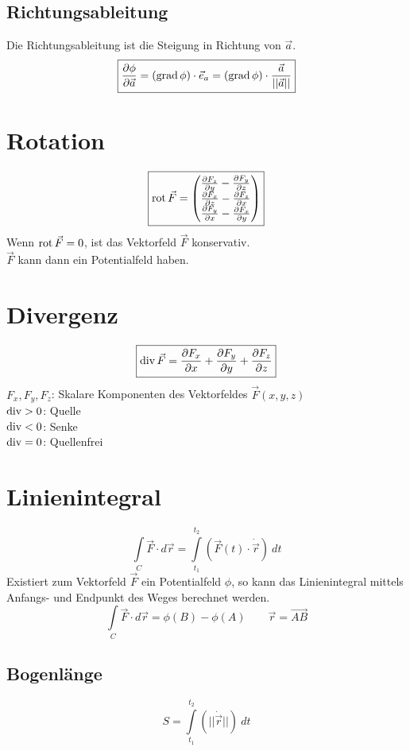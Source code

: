 \subsection{Richtungsableitung}
Die Richtungsableitung ist die Steigung in Richtung von $\vec{a}$. 
\[ \boxed{\frac{\partial \phi}{\partial \vec{a}} 
= (\operatorname{grad} \phi) \cdot \vec{e}_a 
= (\operatorname{grad} \phi) \cdot \frac{\vec{a}}{||\vec{a}||}} \]

\section{Rotation}
\[ \boxed{\rot \vec{F} = \left( \begin{array}{@{}l@{}} 
\frac{\partial F_z}{\partial y} - \frac{\partial F_y}{\partial z} \\
\frac{\partial F_x}{\partial z} - \frac{\partial F_z}{\partial x} \\
\frac{\partial F_y}{\partial x} - \frac{\partial F_x}{\partial y} \\
\end{array}\right)} \]
Wenn $\operatorname{rot}\vec{F}=0$, ist das Vektorfeld $\vec{F}$ konservativ. \\
$\vec{F}$ kann dann ein Potentialfeld haben.

\section{Divergenz}
\[ \boxed{\operatorname{div} \vec{F} = \frac{\partial F_x}{\partial x} 
+ \frac{\partial F_y}{\partial y} + \frac{\partial F_z}{\partial z}} \]
$F_x, F_y, F_z$: Skalare Komponenten des Vektorfeldes $\vec{F}(x,y,z)$\\
$\operatorname{div} > 0$: Quelle \\
$\operatorname{div} < 0$: Senke \\
$\operatorname{div} = 0$: Quellenfrei

\section{Linienintegral}
\[ \boxed{\int\limits_{C} \vec{F} \cdot d\vec{r} 
= \int\limits_{t_1}^{t_2} \left(\vec{F}(t) \cdot \dot{\vec{r}}\right) ~ dt} \]
Existiert zum Vektorfeld $\vec{F}$ ein Potentialfeld $\phi$, so kann das 
Linienintegral mittels Anfangs- und Endpunkt des Weges berechnet werden. 
\[ \boxed{\int\limits_{C} \vec{F} \cdot d \vec{r} = \phi(B) - \phi(A)} 
\qquad \vec{r} = \overrightarrow{AB} \]

\subsection{Bogenlänge}
\[ \boxed{S = \int\limits_{t_1}^{t_2} \left(|| \dot{\vec{r}} ||\right) ~dt} \]

